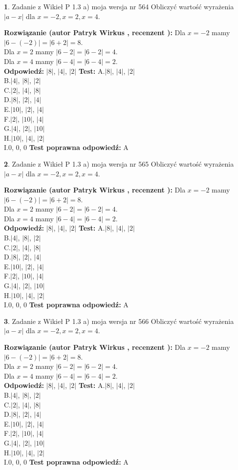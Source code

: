 \documentclass[12pt, a4paper]{article}
\theoremstyle{definition} %
\newtheorem{zad}{}
\newcommand{\zadStart}[1]{\begin{zad}#1\newline}
\newcommand{\zadStop}{\end{zad}}
\newcommand{\rozwStart}[2]{\noindent \textbf{Rozwiązanie (autor #1 , recenzent #2): }\newline}
\newcommand{\rozwStop}{\newline}
\newcommand{\odpStart}{\noindent \textbf{Odpowiedź:}\newline}
\newcommand{\odpStop}{\newline}
\newcommand{\testStart}{\noindent \textbf{Test:}\newline}
\newcommand{\testStop}{\newline}
\newcommand{\kluczStart}{\noindent \textbf{Test poprawna odpowiedź:}\newline}
\newcommand{\kluczStop}{\newline}
\begin{document}
\zadStart{Zadanie z Wikieł P 1.3 a) moja wersja nr 564}
Obliczyć wartość wyrażenia $|a - x|$ dla $x=-2,x=2,x=4$.
\zadStop
\rozwStart{Patryk Wirkus}{}
Dla $x = -2$ mamy $|6 - (-2)| = |6 + 2| = 8$.\\
Dla $x = 2$ mamy $|6 - 2| = |6 - 2| = 4$.\\
Dla $x = 4$ mamy $|6 - 4| = |6 - 4| = 2$.\\
\rozwStop
\odpStart
$|8|$, $|4|$, $|2|$
\odpStop
\testStart
A.$|8|$, $|4|$, $|2|$\\
B.$|4|$, $|8|$, $|2|$\\
C.$|2|$, $|4|$, $|8|$\\
D.$|8|$, $|2|$, $|4|$\\
E.$|10|$, $|2|$, $|4|$\\
F.$|2|$, $|10|$, $|4|$\\
G.$|4|$, $|2|$, $|10|$\\
H.$|10|$, $|4|$, $|2|$\\
I.$0$, $0$, $0$
\testStop
\kluczStart
A
\kluczStop



\zadStart{Zadanie z Wikieł P 1.3 a) moja wersja nr 565}
Obliczyć wartość wyrażenia $|a - x|$ dla $x=-2,x=2,x=4$.
\zadStop
\rozwStart{Patryk Wirkus}{}
Dla $x = -2$ mamy $|6 - (-2)| = |6 + 2| = 8$.\\
Dla $x = 2$ mamy $|6 - 2| = |6 - 2| = 4$.\\
Dla $x = 4$ mamy $|6 - 4| = |6 - 4| = 2$.\\
\rozwStop
\odpStart
$|8|$, $|4|$, $|2|$
\odpStop
\testStart
A.$|8|$, $|4|$, $|2|$\\
B.$|4|$, $|8|$, $|2|$\\
C.$|2|$, $|4|$, $|8|$\\
D.$|8|$, $|2|$, $|4|$\\
E.$|10|$, $|2|$, $|4|$\\
F.$|2|$, $|10|$, $|4|$\\
G.$|4|$, $|2|$, $|10|$\\
H.$|10|$, $|4|$, $|2|$\\
I.$0$, $0$, $0$
\testStop
\kluczStart
A
\kluczStop



\zadStart{Zadanie z Wikieł P 1.3 a) moja wersja nr 566}
Obliczyć wartość wyrażenia $|a - x|$ dla $x=-2,x=2,x=4$.
\zadStop
\rozwStart{Patryk Wirkus}{}
Dla $x = -2$ mamy $|6 - (-2)| = |6 + 2| = 8$.\\
Dla $x = 2$ mamy $|6 - 2| = |6 - 2| = 4$.\\
Dla $x = 4$ mamy $|6 - 4| = |6 - 4| = 2$.\\
\rozwStop
\odpStart
$|8|$, $|4|$, $|2|$
\odpStop
\testStart
A.$|8|$, $|4|$, $|2|$\\
B.$|4|$, $|8|$, $|2|$\\
C.$|2|$, $|4|$, $|8|$\\
D.$|8|$, $|2|$, $|4|$\\
E.$|10|$, $|2|$, $|4|$\\
F.$|2|$, $|10|$, $|4|$\\
G.$|4|$, $|2|$, $|10|$\\
H.$|10|$, $|4|$, $|2|$\\
I.$0$, $0$, $0$
\testStop
\kluczStart
A
\kluczStop
\end{document}
